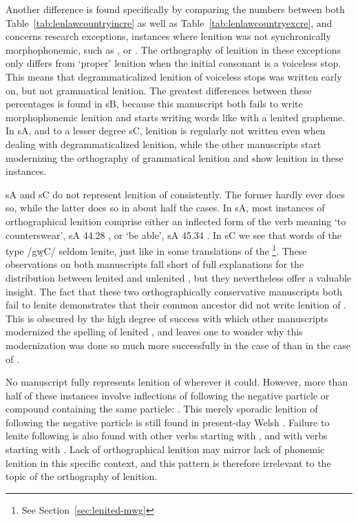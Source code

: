 Another difference is found specifically by comparing the numbers between both Table~\ref{tab:lenlawcountryincre} as well as Table~\ref{tab:lenlawcountryexcre}, and concerns research exceptions, \ie instances where lenition was not synchronically morphophonemic, such as , or . The orthography of lenition in these exceptions only differs from `proper' lenition when the initial consonant is a voiceless stop. This means that degrammaticalized lenition of voiceless stops was written early on, but not grammatical lenition. The greatest differences between these percentages is found in \gls{sB}, because this manuscript both fails to write morphophonemic lenition and starts writing words like  with a lenited grapheme. In \gls{sA}, and to a lesser degree \gls{sC}, lenition is regularly not written even when dealing with degrammaticalized lenition, while the other manuscripts start modernizing the orthography of grammatical lenition and show lenition in these instances.

\Gls{sA} and \gls{sC} do not represent lenition of  consistently. The former hardly ever does so, while the latter does so in about half the cases. In \gls{sA}, most instances of orthographical lenition comprise either an inflected form of the verb meaning `to counterswear', \eg \gls{sA} 44.28 , or `be able', \eg \gls{sA} 45.34 . In \gls{sC} we see that words of the type /gw̯\gls{C}/ seldom lenite, just like in some translations of the \footnote{See Section~\ref{sec:lenited-mwg}}. These observations on both manuscripts fall short of full explanations for the distribution between lenited and unlenited , but they nevertheless offer a valuable insight. The fact that these two orthographically conservative manuscripts both fail to lenite  demonstrates that their common ancestor did not write lenition of . This is obscured by the high degree of success with which other manuscripts modernized the spelling of lenited , and leaves one to wonder why this modernization was done so much more successfully in the case of  than in the case of .

No manuscript fully represents lenition of  wherever it could. However, more than half of these instances involve inflections of  following the negative particle  or compound containing the same particle: . This merely sporadic lenition of  following the negative particle is still found in present-day Welsh \autocite[695]{thomas_gramadeg_1996}. Failure to lenite following  is also found with other verbs starting with , and with verbs starting with . Lack of orthographical lenition may mirror lack of phonemic lenition in this specific context, and this pattern is therefore irrelevant to the topic of the orthography of lenition. 


